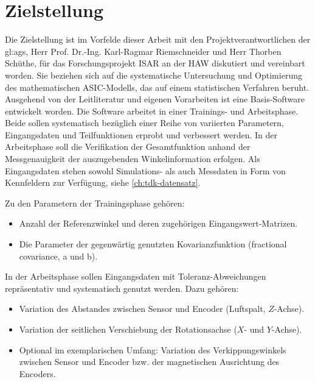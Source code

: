 %

\section{Zielstellung}\label{sec:zielstellung}


Die Zielstellung ist im Vorfelde dieser Arbeit mit den Projektverantwortlichen der \gls{gl:ags}, Herr Prof. Dr.-Ing. Karl-Ragmar Riemschneider und Herr Thorben Schüthe, für das Forschungsprojekt ISAR an der HAW diskutiert und vereinbart worden. Sie beziehen sich auf die systematische Untersuchung und Optimierung des mathematischen ASIC-Modells, das auf einem statistischen Verfahren beruht. Ausgehend von der Leitliteratur \cite{Rasmussen2006} und eigenen Vorarbeiten \cite{Schuethe2019}\cite{Schuethe2020b}\cite{Schuethe2020}\cite{Schuethe2020a} ist eine Basis-Software entwickelt worden. Die Software arbeitet in einer Trainings- und Arbeitsphase. Beide sollen
systematisch bezüglich einer Reihe von variierten Parametern, Eingangsdaten und Teilfunktionen erprobt und verbessert werden. In der Arbeitsphase soll die Verifikation der Gesamtfunktion anhand
der Messgenauigkeit der auszugebenden Winkelinformation erfolgen. Als Eingangsdaten stehen sowohl
Simulations- als auch Messdaten in Form von Kennfeldern zur Verfügung, siehe \autoref{ch:tdk-datensatz}.


Zu den Parametern der Trainingsphase gehören:

\begin{itemize}
	\item Anzahl der Referenzwinkel und deren zugehörigen Eingangswert-Matrizen.
	\item Die Parameter der gegenwärtig genutzten Kovarianzfunktion (fractional covariance, a und b).
\end{itemize}


In der Arbeitsphase sollen Eingangsdaten mit Toleranz-Abweichungen repräsentativ und systematisch
genutzt werden. Dazu gehören:

\begin{itemize}
	\item Variation des Abstandes zwischen Sensor und Encoder (Luftspalt, $Z$-Achse).
	\item Variation der seitlichen Verschiebung der Rotationsachse ($X$- und $Y$-Achse).
	\item Optional im exemplarischen Umfang: Variation des Verkippungswinkels zwischen Sensor und Encoder bzw. der magnetischen Ausrichtung des Encoders.
\end{itemize}

